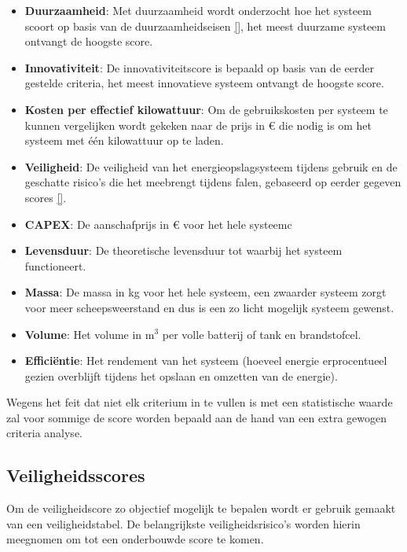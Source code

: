 \begin{itemize}
    \item \textbf{Duurzaamheid}: Met duurzaamheid wordt onderzocht hoe het systeem scoort op basis van de duurzaamheidseisen \ref{}, het meest duurzame systeem ontvangt de hoogste score.
    \item \textbf{Innovativiteit}: De innovativiteitscore is bepaald op basis van de eerder gestelde criteria, het meest innovatieve systeem ontvangt de hoogste score.
    \item \textbf{Kosten per effectief kilowattuur}: Om de gebruikskosten per systeem te kunnen  vergelijken wordt gekeken naar de prijs in $€$ die nodig is om het systeem met één kilowattuur op te laden.
    \item \textbf{Veiligheid}: De veiligheid van het energieopslagsysteem tijdens gebruik en de geschatte risico's die het meebrengt tijdens falen, gebaseerd op eerder gegeven scores \ref{}.
    \item \textbf{CAPEX}: De aanschafprijs in $€$ voor het hele systeemc
    \item \textbf{Levensduur}: De theoretische levensduur tot waarbij het systeem functioneert.
    \item \textbf{Massa}: De massa in kg voor het hele systeem, een zwaarder systeem zorgt voor meer scheepsweerstand en dus is een zo licht mogelijk systeem gewenst.
    \item \textbf{Volume}: Het volume in m$^3$ per volle batterij of tank en brandstofcel.
    \item \textbf{Efficiëntie}: Het rendement van het systeem (hoeveel energie erprocentueel gezien overblijft tijdens het opslaan en omzetten van de energie).
\end{itemize}


\vspace{4mm}
\noindent Wegens het feit dat niet elk criterium in te vullen is met een statistische waarde zal voor sommige de score worden bepaald aan de hand van een extra gewogen criteria analyse.

\subsection*{Veiligheidsscores}

\noindent Om de veiligheidscore zo objectief mogelijk te bepalen wordt er gebruik gemaakt van een veiligheidstabel. De belangrijkste veiligheidsrisico's worden hierin meegnomen om tot een onderbouwde score te komen.


